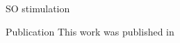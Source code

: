 \documentclass[aspectratio=43]{beamer}
\begin{document}
\begin{frame}{SO stimulation}
\begin{figure}[hbt!]
\begin{minipage}[b]{0.44\textwidth}
\begin{minipage}[b]{\textwidth}
					\end{minipage}
				\end{minipage}
			\end{figure}
			
\end{frame}

\begin{frame}{Publication}
	\centering
	This work was published in \\ 
\end{frame}
\end{document}
